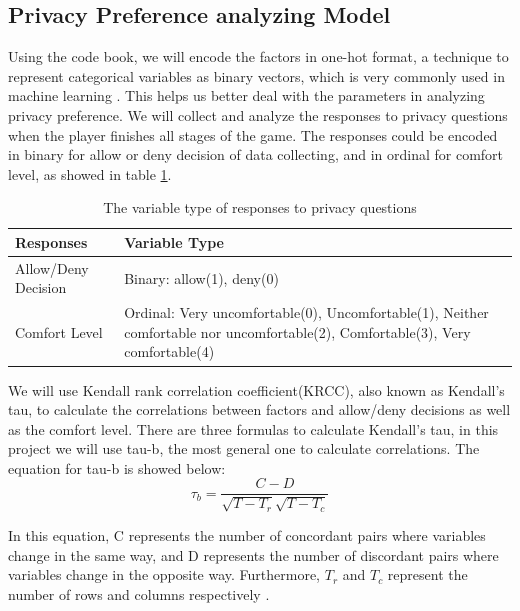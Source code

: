 \documentclass[a4paper,11pt]{article}
\begin{document}
\subsection{Privacy Preference analyzing Model}

Using the code book, we will encode the factors in one-hot format, a technique to represent categorical variables as binary vectors, which is very commonly used in machine learning \cite{Hancock}. This helps us better deal with the parameters in analyzing privacy preference. We will collect and analyze the responses to privacy questions when the player finishes all stages of the game. The responses could be encoded in binary for allow or deny decision of data collecting, and in ordinal for comfort level, as showed in table \ref{tab:responses}.

\begin{table}[htbp]
    \begin{center}
    \begin{adjustwidth}{0cm}{0cm}
    \begin{tabular}{ |p{}| p{}|}
        \hline
        \textbf{Responses} & \textbf{Variable Type}\\
        \hline
        Allow/Deny Decision& Binary: allow(1), deny(0)\\
        \hline
        Comfort Level & Ordinal: Very uncomfortable(0), Uncomfortable(1), Neither comfortable nor uncomfortable(2), Comfortable(3), Very comfortable(4)\\
        \hline
        \end{tabular} 
        \end{adjustwidth}
    \end{center}
    \caption{The variable type of responses to privacy questions}
    \label{tab:responses}
\end{table}

We will use Kendall rank correlation coefficient(KRCC), also known as Kendall's tau, to calculate the correlations between factors and allow/deny decisions as well as the comfort level. There are three formulas to calculate Kendall's tau, in this project we will use tau-b, the most general one to calculate correlations. The equation for tau-b is showed below:
\begin{equation}
    \tau_{b} = \frac{C-D}{\sqrt{T-T_{r}}\sqrt{T-T_{c}}}
\end{equation}

In this equation, C represents the number of concordant pairs where variables change in the same way, and D represents the number of discordant pairs where variables change in the opposite way. Furthermore, $T_{r}$ and $T_{c}$ represent the number of rows and columns respectively \cite{Puka2011}.
\end{document}
